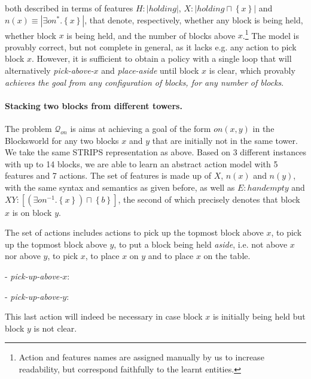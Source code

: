\documentclass[letterpaper]{article} %
\newcommand{\set}[1]{\ensuremath{\left\{#1 \right\}}}
\newcommand{\abs}[1]{\ensuremath{\left\vert{#1}\right\vert}}
\newcommand{\Q}{\mathcal{Q}}
\begin{document}
\noindent both described in terms of features $H: \abs{holding}$, $X: \abs{holding \sqcap \set{x}}$ and $n(x)\equiv \abs{\exists on^* . \set{x}}$, 
that denote, respectively, whether any block is being held, whether block $x$ is being held,
and the number of blocks above $x$.\footnote{
Action and features names are assigned manually by us to increase readability, but correspond faithfully
to the learnt entities.
}
%
The model is provably correct, but not complete in general, as it lacks e.g.
any action to pick block $x$.
However, it is sufficient to obtain a policy with a single loop that will 
alternatively \emph{pick-above-$x$} and \emph{place-aside} until block $x$ is clear,
which provably \emph{achieves the goal from any configuration of blocks, for any number of blocks}.

% 

% 

\paragraph{Stacking two blocks from different towers.}
The problem $\Q_{on}$ is aims at achieving a goal of the form $on(x,y)$
in the Blocksworld for any two blocks $x$ and $y$ that are initially not in the same tower.
We take the same STRIPS representation as above. Based on 3 different instances with up to 14
blocks, we are able to learn an abstract action model with 5 features and 7 actions.
The set of features is made up of  $X$, $n(x)$ and $n(y)$, with the same syntax and semantics as given before,
as well as $E: handempty$
and $XY: [(\exists on^{-1} . \set{x})\sqcap \set{b}]$,
the second of which precisely denotes that block $x$ is on block $y$.

The set of actions includes actions to pick up the topmost block above $x$, to pick up the topmost block above $y$,
to put a block being held \emph{aside}, i.e. not above $x$ nor above $y$, to pick $x$, 
to place $x$ on $y$ and to place $x$ on the table.

- \emph{pick-up-above-$x$}:

- \emph{pick-up-above-$y$}:

This last action will indeed be necessary in case block $x$ is initially being held
but block $y$ is not clear.
\end{document}
